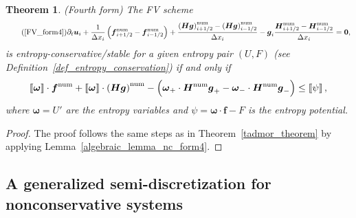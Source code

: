 \documentclass[]{scrartcl}
\renewcommand{\vec}[1]{\boldsymbol{#1}}
\newcommand{\jump}[1]{\left\llbracket #1  \right\rrbracket}
\newtheorem{theorem}{Theorem}[section]
\theoremstyle{definition}
\begin{document}
\begin{theorem}{(Fourth form)}
    The FV scheme
    \begin{equation}
    \tag{\ref{FV_form4}}
\partial_t \vec{u}_i + \frac{1}{\Delta x_i} \left  ( \vec{f}^{\mathrm{num}}_{i+1/2} - \vec{f}^{\mathrm{num}}_{i-1/2}\right ) + \frac{\left (\vec{H} \vec{g} \right ) ^{\mathrm{num}}_{i+1/2} - \left (\vec{H} \vec{g} \right ) ^{\mathrm{num}}_{i-1/2}}{\Delta x_i} -\vec{g}_i \frac{\vec{H}^{\mathrm{num}}_{i+1/2} - \vec{H}^{\mathrm{num}}_{i-1/2}}{\Delta x_i}  = \vec{0},
\end{equation}
is entropy-conservative/stable for a given entropy pair $(U, F)$ (see Definition~\ref{def_entropy_conservation}) if and only if
\begin{equation}
\label{TadmorDef_form4}
	\jump{\vec{\omega}} \cdot \vec{f}^\mathrm{num} + \jump{\vec{\omega}} \cdot \left (\vec{H} \vec{g} \right )^{\mathrm{num}} - \Bigl (\vec{\omega}_+ \cdot \vec{H}^{\mathrm{num}} \vec{g}_+ - \vec{\omega}_- \cdot \vec{H}^{\mathrm{num}} \vec{g}_-\Bigr ) \leq \jump{\psi},
\end{equation}
where $\vec{\omega} = U'$ are the entropy variables and $\psi = \vec{\omega} \cdot \vec{f} - F$ is the entropy potential.
\end{theorem}
\begin{proof}
The proof follows the same steps as in Theorem~\ref{tadmor_theorem} by applying Lemma~\ref{algebraic_lemma_nc_form4}.
\end{proof}

\subsection{A generalized semi-discretization for nonconservative systems}
\end{document}
